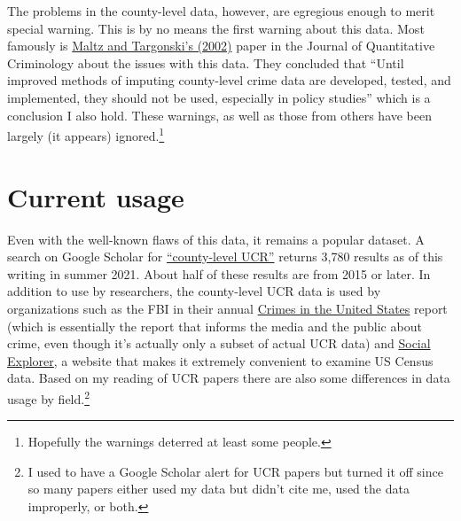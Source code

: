 \documentclass[
  12pt,
  openany]{book}
\begin{document}
The problems in the county-level data, however, are egregious enough to merit special warning. This is by no means the first warning about this data. Most famously is \href{https://link.springer.com/article/10.1023/A:1016060020848}{Maltz and Targonski's (2002)} paper in the Journal of Quantitative Criminology about the issues with this data. They concluded that ``Until improved methods of imputing county-level crime data are developed, tested, and implemented, they should not be used, especially in policy studies'' which is a conclusion I also hold. These warnings, as well as those from others have been largely (it appears) ignored.\footnote{Hopefully the warnings deterred at least some people.}

\hypertarget{current-usage}{%
\section{Current usage}\label{current-usage}}

Even with the well-known flaws of this data, it remains a popular dataset. A search on Google Scholar for \href{https://scholar.google.com/scholar?q=county-level+ucr\&hl=en\&as_sdt=0,20}{``county-level UCR''} returns 3,780 results as of this writing in summer 2021. About half of these results are from 2015 or later. In addition to use by researchers, the county-level UCR data is used by organizations such as the FBI in their annual \href{https://ucr.fbi.gov/crime-in-the-u.s}{Crimes in the United States} report (which is essentially the report that informs the media and the public about crime, even though it's actually only a subset of actual UCR data) and \href{https://www.socialexplorer.com/explore-maps}{Social Explorer}, a website that makes it extremely convenient to examine US Census data. Based on my reading of UCR papers there are also some differences in data usage by field.\footnote{I used to have a Google Scholar alert for UCR papers but turned it off since so many papers either used my data but didn't cite me, used the data improperly, or both.}
\end{document}
